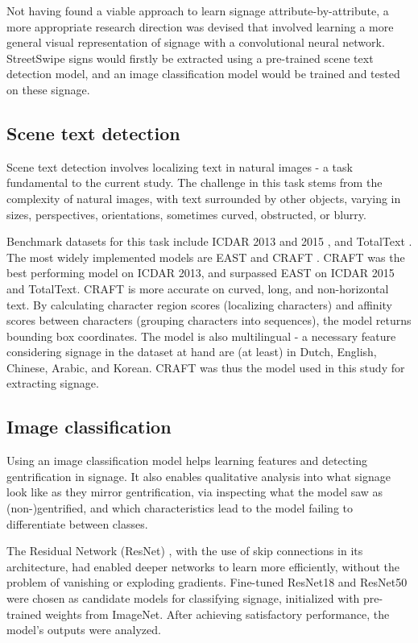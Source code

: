 Not having found a viable approach to learn signage attribute-by-attribute, a more appropriate research direction was devised that involved learning a more general visual representation of signage with a convolutional neural network. StreetSwipe signs would firstly be extracted using a pre-trained scene text detection model, and an image classification model would be trained and tested on these signage.

\subsection{Scene text detection}
Scene text detection involves localizing text in natural images - a task fundamental to the current study. The challenge in this task stems from the complexity of natural images, with text surrounded by other objects, varying in sizes, perspectives, orientations, sometimes curved, obstructed, or blurry.

Benchmark datasets for this task include ICDAR 2013 \cite{icdar13} and 2015 \cite{icdar15}, and TotalText \cite{totaltext}. The most widely implemented models are EAST \cite{zhou_east_2017} and CRAFT \cite{baek_character_2019}. CRAFT was the best performing model on ICDAR 2013, and surpassed EAST on ICDAR 2015 and TotalText. CRAFT is more accurate on curved, long, and non-horizontal text. By calculating character region scores (localizing characters) and affinity scores between characters (grouping characters into sequences), the model returns bounding box coordinates. The model is also multilingual - a necessary feature considering signage in the dataset at hand are (at least) in Dutch, English, Chinese, Arabic, and Korean. CRAFT was thus the model used in this study for extracting signage.


\subsection{Image classification}

Using an image classification model helps learning features and detecting gentrification in signage. It also enables qualitative analysis into what signage look like as they mirror gentrification, via inspecting what the model saw as (non-)gentrified, and which characteristics lead to the model failing to differentiate between classes.

The Residual Network (ResNet) \cite{resnet}, with the use of skip connections in its architecture, had enabled deeper networks to learn more efficiently, without the problem of vanishing or exploding gradients. Fine-tuned ResNet18 and ResNet50 were chosen as candidate models for classifying signage, initialized with pre-trained weights from ImageNet. After achieving satisfactory performance, the model's outputs were analyzed. 


